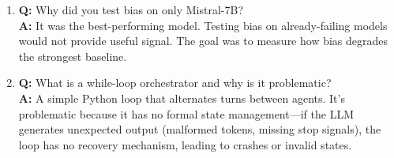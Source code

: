 \begin{vivabox}[\textcolor{white}{Likely Viva Questions}]
\begin{enumerate}
    \item \textbf{Q:} Why did you test bias on only Mistral-7B?\\
    \textbf{A:} It was the best-performing model. Testing bias on already-failing models would not provide useful signal. The goal was to measure how bias degrades the strongest baseline.

    \item \textbf{Q:} What is a while-loop orchestrator and why is it problematic?\\
    \textbf{A:} A simple Python loop that alternates turns between agents. It's problematic because it has no formal state management---if the LLM generates unexpected output (malformed tokens, missing stop signals), the loop has no recovery mechanism, leading to crashes or invalid states.
\end{enumerate}
\end{vivabox}

